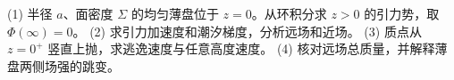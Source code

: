 (1) 半径 \(a\)、面密度 \(\Sigma\) 的均匀薄盘位于 \(z=0\)。从环积分求 \(z>0\) 的引力势，取 \(\Phi(\infty)=0\)。
(2) 求引力加速度和潮汐梯度，分析远场和近场。
(3) 质点从 \(z=0^+\) 竖直上抛，求逃逸速度与任意高度速度。
(4) 核对远场总质量，并解释薄盘两侧场强的跳变。
